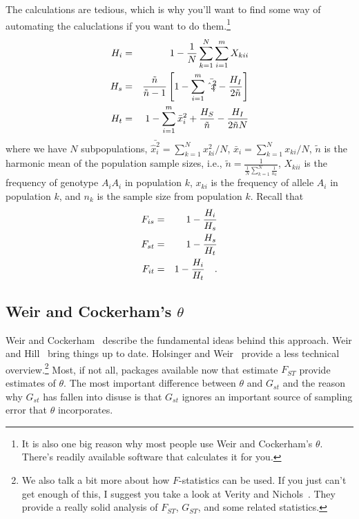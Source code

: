 The calculations are tedious, which is why you'll want to find some
way of automating the caluclations if you want to do them.\footnote{It
  is also one big reason why most people use Weir and Cockerham's
  $\theta$. There's readily available software that calculates it for
  you.}
\begin{eqnarray*}
H_{i} &=& 1 - {1 \over N} \sum_{k=1}^{N} \sum_{i=1}^{m} {X_{kii}} \\
H_{s} &=& {\tilde n \over {\tilde n - 1}}
         \left[1 - \sum_{i=1}^{m} {\bar {\hat x_{i}^{2}}}
         - {H_{I} \over {2 \tilde n}}\right] \\
H_{t} &=& 1 - \sum_{i=1}^{m} {\bar x_{i}^{2}} + {H_{S} \over {\tilde n}}
         - {H_{I} \over {2 \tilde n N}}
\end{eqnarray*}
where we have $N$ subpopulations,
${\bar {\hat x_{i}^{2}}} = \sum_{k=1}^{N} {x_{ki}^{2}}/N$,
${\bar x_{i}} = \sum_{k=1}^{N} x_{ki}/N$, $\tilde n$
is the harmonic mean of the population sample sizes, i.e.,
$ \tilde n = \frac{1}{\frac{1}{N} \sum_{k=1}^{N} \frac{1}{n_k}}$,
$X_{kii}$ is the frequency of genotype $A_{i}A_{i}$ in population $k$,
$x_{ki}$ is the frequency of allele $A_{i}$ in population $k$, and $n_k$ is
the sample size from population $k$.  Recall that
\begin{eqnarray*}
F_{is} &=& 1 - {H_{i} \over H_{s}} \\
F_{st} &=& 1 - {H_{s} \over H_{t}} \\
F_{it} &=& 1 - {H_{i} \over H_{t}} \quad .
\end{eqnarray*}

\subsection*{Weir and Cockerham's $\theta$}

Weir and Cockerham~\cite{WeirCockerham84} describe the fundamental
ideas behind this approach. Weir and Hill~\cite{Weir-Hill-2002} bring
things up to date. Holsinger and Weir~\cite{Holsinger-Weir-2009}
provide a less technical overview.\footnote{We also talk a bit more
  about how $F$-statistics can be used. If you just can't get enough
  of this, I suggest you take a look at Verity and
  Nichols~\cite{Verity-Nichols-2014}. They provide a really solid
  analysis of $F_{ST}$, $G_{ST}$, and some related statistics.} Most,
if not all, packages available now that estimate $F_{ST}$ provide
estimates of $\theta$. The most important difference between $\theta$
and $G_{st}$ and the reason why $G_{st}$ has fallen into disuse is
that $G_{st}$ ignores an important source of sampling error that
$\theta$ incorporates.

